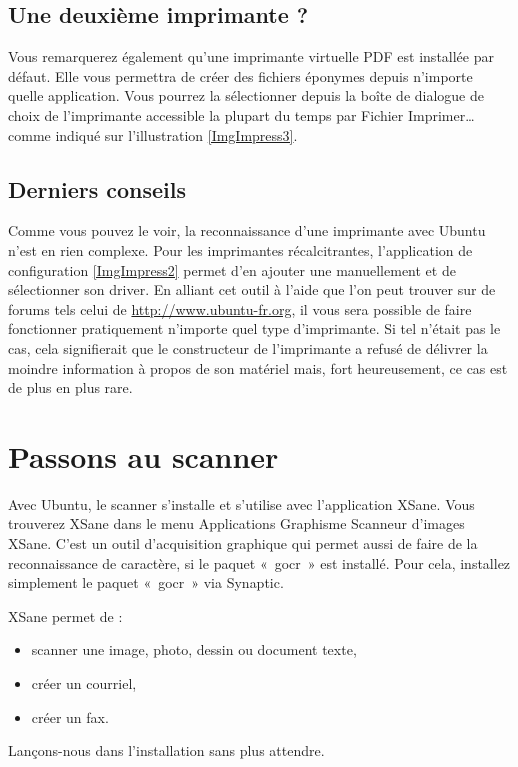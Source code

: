 \subsection{Une deuxième imprimante ?}
Vous remarquerez également qu'une imprimante virtuelle PDF est installée par défaut. Elle vous permettra de créer des fichiers éponymes depuis n’importe quelle application. Vous pourrez la sélectionner depuis la boîte de dialogue de choix de l'imprimante accessible la plupart du temps par Fichier \FlecheDroite Imprimer\dots{} comme indiqué sur l'illustration \ref{ImgImpress3}.\par
{}
\subsection{Derniers conseils}
Comme vous pouvez le voir, la reconnaissance d'une imprimante avec Ubuntu n'est en rien complexe. Pour les imprimantes récalcitrantes, l'application de configuration \ref{ImgImpress2} permet d'en ajouter une manuellement et de sélectionner son driver. En alliant cet outil à l'aide que l'on peut trouver sur de forums tels celui de \url{http://www.ubuntu-fr.org}, il vous sera possible de faire fonctionner pratiquement n'importe quel type d'imprimante. Si tel n'était pas le cas, cela signifierait que le constructeur de l'imprimante a refusé de délivrer la moindre information à propos de son matériel mais, fort heureusement, ce cas est de plus en plus rare.
\section{Passons au scanner}
Avec Ubuntu, le scanner s'installe et s'utilise avec l'application XSane. Vous trouverez XSane dans le menu  Applications \FlecheDroite Graphisme \FlecheDroite Scanneur d'images XSane. C'est un outil d'acquisition graphique qui permet aussi de faire de la reconnaissance de caractère, si le paquet «~gocr~» est installé. Pour cela, installez simplement le paquet «~gocr~» via Synaptic.\par
XSane permet de :
\begin{itemize}
\item scanner une image, photo, dessin ou document texte, 
\item créer un courriel, 
\item créer un fax. 
\end{itemize}
Lançons-nous dans l'installation sans plus attendre.
